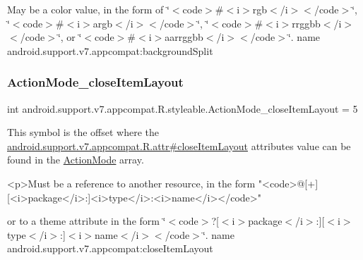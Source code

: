 May be a color value, in the form of \char`\"{}$<$code$>$\#$<$i$>$rgb$<$/i$>$$<$/code$>$\char`\"{}, \char`\"{}$<$code$>$\#$<$i$>$argb$<$/i$>$$<$/code$>$\char`\"{}, \char`\"{}$<$code$>$\#$<$i$>$rrggbb$<$/i$>$$<$/code$>$\char`\"{}, or \char`\"{}$<$code$>$\#$<$i$>$aarrggbb$<$/i$>$$<$/code$>$\char`\"{}.  name android.\+support.\+v7.\+appcompat\+:background\+Split \mbox{\label{classandroid_1_1support_1_1v7_1_1appcompat_1_1R_1_1styleable_a0488491d4fd5b6f8773b484815cbebce}} 
\subsubsection{\texorpdfstring{Action\+Mode\+\_\+close\+Item\+Layout}{ActionMode\_closeItemLayout}}
{\footnotesize\ttfamily int android.\+support.\+v7.\+appcompat.\+R.\+styleable.\+Action\+Mode\+\_\+close\+Item\+Layout = 5\hspace{0.3cm}{\ttfamily [static]}}

This symbol is the offset where the \hyperlink{classandroid_1_1support_1_1v7_1_1appcompat_1_1R_1_1attr_a8372686a9d3636588a945d0cfd5ac569}{android.\+support.\+v7.\+appcompat.\+R.\+attr\#close\+Item\+Layout} attribute\textquotesingle{}s value can be found in the \hyperlink{classandroid_1_1support_1_1v7_1_1appcompat_1_1R_1_1styleable_ac4197f1a9a85a8f5973cc5efa358ad9f}{Action\+Mode} array.

\begin{DoxyVerb}      <p>Must be a reference to another resource, in the form "<code>@[+][<i>package</i>:]<i>type</i>:<i>name</i></code>"
\end{DoxyVerb}
 or to a theme attribute in the form \char`\"{}$<$code$>$?\mbox{[}$<$i$>$package$<$/i$>$\+:\mbox{]}\mbox{[}$<$i$>$type$<$/i$>$\+:\mbox{]}$<$i$>$name$<$/i$>$$<$/code$>$\char`\"{}.  name android.\+support.\+v7.\+appcompat\+:close\+Item\+Layout \mbox{\label{classandroid_1_1support_1_1v7_1_1appcompat_1_1R_1_1styleable_af4cb45abc591ba3b7f173f869cb69cd7}} 
